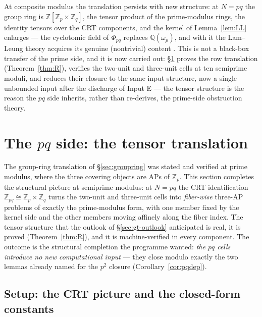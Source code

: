 \documentclass[11pt,a4paper]{article}
\numberwithin{equation}{section}
\theoremstyle{plain}
\theoremstyle{plain}
\theoremstyle{definition}
\theoremstyle{remark}
\newcommand{\Z}{\mathbb{Z}}
\begin{document}
At composite modulus the translation persists with new structure: at
$N=pq$ the group ring is $\Z[\Z_p\times\Z_q]$, the tensor product of the
prime-modulus rings, the identity tensors over the CRT components, and the
kernel of Lemma~\ref{lem:LL} enlarges --- the cyclotomic field of $\Phi_{pq}$
replaces $\mathbb{Q}(\omega_p)$, and with it the Lam--Leung theory acquires its
genuine (nontrivial) content \cite{LamLeung}. This is not a black-box
transfer of the prime side, and it is now carried out: \S\ref{sec:pq}
proves the row translation (Theorem~\ref{thm:R}), verifies the two-unit
and three-unit cells at ten semiprime moduli, and reduces their closure to
the same input structure, now a single unbounded input after the discharge
of Input E --- the tensor structure is the reason the $pq$ side
inherits, rather than re-derives, the prime-side obstruction theory.


\section{The $pq$ side: the tensor translation}\label{sec:pq}

The group-ring translation of \S\ref{sec:groupring} was stated and verified at
prime modulus, where the three covering objects are APs of $\Z_p$. This
section completes the structural picture at semiprime modulus: at $N=pq$ the
CRT identification $\Z_{pq}\cong\Z_p\times\Z_q$ turns the two-unit and
three-unit cells into \emph{fiber-wise} three-AP problems of exactly the
prime-modulus form, with one member fixed by the kernel side and the other
members moving affinely along the fiber index. The tensor structure that the
outlook of \S\ref{sec:gt-outlook} anticipated is real, it is proved
(Theorem~\ref{thm:R}), and it is machine-verified in every component. The
outcome is the structural completion the programme wanted: \emph{the $pq$
cells introduce no new computational input} --- they close modulo exactly the
two lemmas already named for the $p^2$ closure (Corollary~\ref{cor:pqdep}).

\subsection{Setup: the CRT picture and the closed-form constants}
\label{sec:pq-setup}
\end{document}
